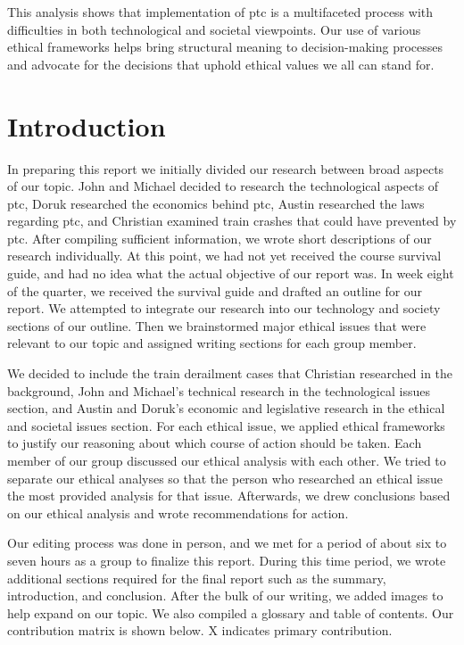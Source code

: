 \documentclass[11pt, titlepage]{article}
\begin{document}
This analysis shows that implementation of \gls{ptc} is a multifaceted process
with difficulties in both technological and societal viewpoints. Our use of
various ethical frameworks helps bring structural meaning to decision-making
processes and advocate for the decisions that uphold ethical values we all can
stand for.

\pagebreak

\section{Introduction}

In preparing this report we initially divided our research between broad aspects
of our topic. John and Michael decided to research the technological aspects of
\gls{ptc}, Doruk researched the economics behind \gls{ptc}, Austin researched the
laws regarding \gls{ptc}, and Christian examined train crashes that could have
prevented by \gls{ptc}. After compiling sufficient information, we wrote short
descriptions of our research individually. At this point, we had not yet received
the course survival guide, and had no idea what the actual objective of our
report was. In week eight of the quarter, we received the survival guide and
drafted an outline for our report. We attempted to integrate our research into
our technology and society sections of our outline. Then we brainstormed major
ethical issues that were relevant to our topic and assigned writing sections for
each group member.

We decided to include the train derailment cases that Christian researched in the
background, John and Michael’s technical research in the technological issues
section, and Austin and Doruk’s economic and legislative research in the ethical
and societal issues section. For each ethical issue, we applied ethical
frameworks to justify our reasoning about which course of action should be taken.
Each member of our group discussed our ethical analysis with each other. We tried
to separate our ethical analyses so that the person who researched an ethical
issue the most provided analysis for that issue. Afterwards, we drew conclusions
based on our ethical analysis and wrote recommendations for action.

Our editing process was done in person, and we met for a period of about six to
seven hours as a group to finalize this report. During this time period, we wrote
additional sections required for the final report such as the summary,
introduction, and conclusion. After the bulk of our writing, we added images to
help expand on our topic. We also compiled a glossary and table of contents. Our
contribution matrix is shown below. X indicates primary contribution.
\end{document}
